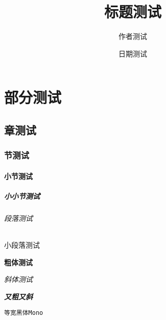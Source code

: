 \documentclass{ctexrep}
\title{标题测试}
\author{作者测试}
\date{日期测试}
\begin{document}
\maketitle
\part{部分测试}
\chapter{章测试}
\section{节测试}
\subsection{小节测试}
\subsubsection{小小节测试}
\paragraph{段落测试}
\subparagraph{小段落测试}

\textbf{粗体测试}

\textit{斜体测试}

\textit{\textbf{又粗又斜}}

\texttt{等宽黑体Mono}
\end{document}
